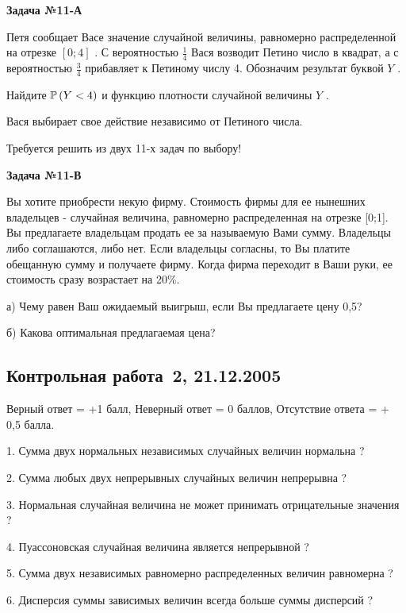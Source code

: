 \documentclass[pdftex,12pt,a4paper]{article}
\begin{document}
{\bf Задача №11}{\bf -А}

Петя сообщает Васе значение случайной величины, равномерно распределенной на отрезке  $[0;4]$ . С вероятностью  $\frac{1}{4} $  Вася возводит Петино число в квадрат, а с вероятностью  $\frac{3}{4} $  прибавляет к Петиному числу 4. Обозначим результат буквой  $Y$ .

Найдите  $\P\left(Y<4\right)$  и функцию плотности случайной величины  $Y$ .

Вася выбирает свое действие независимо от Петиного числа.

Требуется решить {\bf {}} из двух 11-х задач по выбору!

{\bf Задача №11}{\bf -В}

Вы хотите приобрести некую фирму. Стоимость фирмы для ее нынешних владельцев - случайная величина, равномерно распределенная на отрезке [0;1]. Вы предлагаете владельцам продать ее за называемую Вами сумму. Владельцы либо соглашаются, либо нет. Если владельцы согласны, то Вы платите обещанную сумму и получаете фирму. Когда фирма переходит в Ваши руки, ее стоимость сразу возрастает на 20\%.

а)	Чему равен Ваш ожидаемый выигрыш, если Вы предлагаете цену 0,5?

б)	Какова оптимальная предлагаемая цена?


\subsection{Контрольная работа \No\,2, 21.12.2005}




Верный ответ = +1 балл, Неверный ответ = 0 баллов, Отсутствие ответа = + 0,5 балла.

1. Сумма двух нормальных независимых случайных величин нормальна ?

2. Сумма любых двух непрерывных случайных величин непрерывна ?

3. Нормальная случайная величина не может принимать отрицательные значения ?

4. Пуассоновская случайная величина является непрерывной ?

5. Сумма двух независимых равномерно распределенных величин равномерна ?

6. Дисперсия суммы зависимых величин всегда больше суммы дисперсий ?
\end{document}
